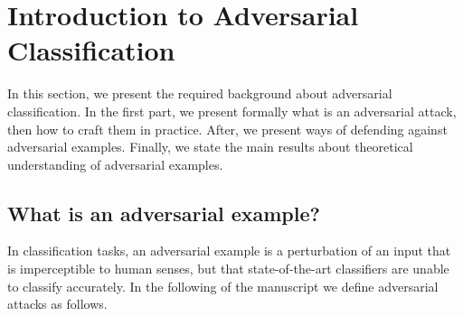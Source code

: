 
\section{Introduction to Adversarial Classification}

In this section, we present the required background about adversarial classification. In the first part, we present formally what is an adversarial attack, then how to craft them in practice. After, we present ways of defending against adversarial examples. Finally, we state the main results about theoretical understanding of adversarial examples. 
\subsection{What is an adversarial example?}

In classification tasks, an adversarial example is a perturbation of an input that is imperceptible to human senses, but that state-of-the-art classifiers are unable to  classify accurately. In the following of the manuscript we define adversarial attacks as follows.


